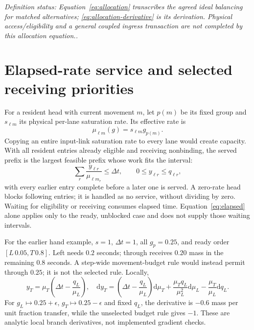 \documentclass[11pt]{article}
\newcommand{\dd}{\mathrm d}
\newcommand{\status}[1]{\textit{Definition status: #1.}}
\begin{document}
\status{Equation~\eqref{eq:allocation} transcribes the agreed ideal balancing for matched alternatives; \eqref{eq:allocation-derivative} is its derivation. Physical access/eligibility and a general coupled ingress transaction are not completed by this allocation equation.}

\section{Elapsed-rate service and selected receiving priorities}
\label{sec:receiving}

For a resident head with current movement $m$, let $p(m)$ be its fixed group and $s_{\ell m}$ its physical per-lane saturation rate. Its effective rate is
\begin{equation}
 \mu_{\ell m}(g)=s_{\ell m}g_{p(m)}.
 \label{eq:rate}
\end{equation}
Copying an entire input-link saturation rate to every lane would create capacity. With all resident entries already eligible and receiving nonbinding, the served prefix is the largest feasible prefix whose work fits the interval:
\begin{equation}
 \sum_r\frac{y_{\ell r}}{\mu_{\ell m_r}}\leq\Delta t,\qquad
 0\leq y_{\ell r}\leq q_{\ell r},
 \label{eq:elapsed}
\end{equation}
with every earlier entry complete before a later one is served. A zero-rate head blocks following entries; it is handled as no service, without dividing by zero. Waiting for eligibility or receiving consumes elapsed time. Equation~\eqref{eq:elapsed} alone applies only to the ready, unblocked case and does not supply those waiting intervals.

For the earlier hand example, $s=1$, $\Delta t=1$, all $g_p=0.25$, and ready order $[L\,0.05,T\,0.8]$. Left needs $0.2$ seconds; through receives $0.20$ mass in the remaining $0.8$ seconds. A step-wide movement-budget rule would instead permit through $0.25$; it is not the selected rule. Locally,
\begin{equation}
 y_T=\mu_T\left(\Delta t-\frac{q_L}{\mu_L}\right),\quad
 \dd y_T=\left(\Delta t-\frac{q_L}{\mu_L}\right)\dd\mu_T
 +\frac{\mu_Tq_L}{\mu_L^2}\dd\mu_L
 -\frac{\mu_T}{\mu_L}\dd q_L.
 \label{eq:head-derivative}
\end{equation}
For $g_L\mapsto0.25+\epsilon$, $g_T\mapsto0.25-\epsilon$ and fixed $q_L$, the derivative is $-0.6$ mass per unit fraction transfer, while the unselected budget rule gives $-1$. These are analytic local branch derivatives, not implemented gradient checks.
\end{document}
